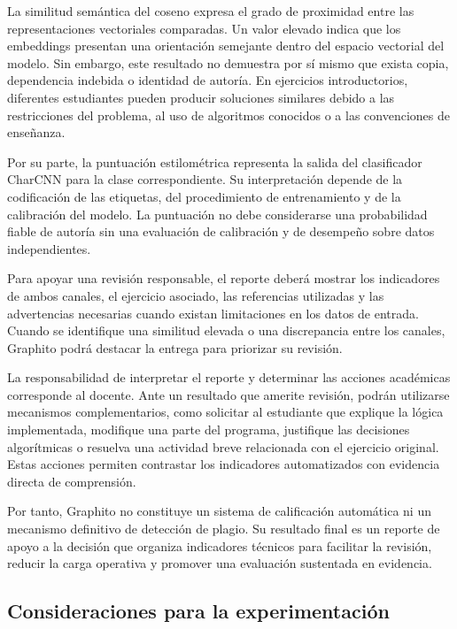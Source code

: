 La similitud semántica del coseno expresa el grado de proximidad entre las representaciones vectoriales comparadas. Un valor elevado indica que los embeddings presentan una orientación semejante dentro del espacio vectorial del modelo. Sin embargo, este resultado no demuestra por sí mismo que exista copia, dependencia indebida o identidad de autoría. En ejercicios introductorios, diferentes estudiantes pueden producir soluciones similares debido a las restricciones del problema, al uso de algoritmos conocidos o a las convenciones de enseñanza.

Por su parte, la puntuación estilométrica representa la salida del clasificador CharCNN para la clase correspondiente. Su interpretación depende de la codificación de las etiquetas, del procedimiento de entrenamiento y de la calibración del modelo. La puntuación no debe considerarse una probabilidad fiable de autoría sin una evaluación de calibración y de desempeño sobre datos independientes.

Para apoyar una revisión responsable, el reporte deberá mostrar los indicadores de ambos canales, el ejercicio asociado, las referencias utilizadas y las advertencias necesarias cuando existan limitaciones en los datos de entrada. Cuando se identifique una similitud elevada o una discrepancia entre los canales, Graphito podrá destacar la entrega para priorizar su revisión.

La responsabilidad de interpretar el reporte y determinar las acciones académicas corresponde al docente. Ante un resultado que amerite revisión, podrán utilizarse mecanismos complementarios, como solicitar al estudiante que explique la lógica implementada, modifique una parte del programa, justifique las decisiones algorítmicas o resuelva una actividad breve relacionada con el ejercicio original. Estas acciones permiten contrastar los indicadores automatizados con evidencia directa de comprensión.

Por tanto, Graphito no constituye un sistema de calificación automática ni un mecanismo definitivo de detección de plagio. Su resultado final es un reporte de apoyo a la decisión que organiza indicadores técnicos para facilitar la revisión, reducir la carga operativa y promover una evaluación sustentada en evidencia.

\subsection{Consideraciones para la experimentación}

